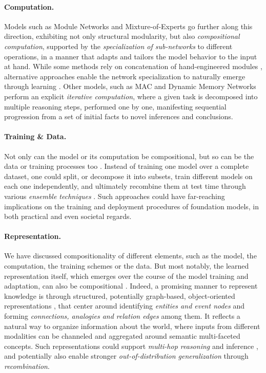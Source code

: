 \paragraph{Computation.}
Models such as Module Networks \citep{nmn} and Mixture-of-Experts \citep{moe} go further along this direction, exhibiting not only structural modularity, but also \textit{compositional computation}, supported by the \textit{specialization of sub-networks} to different operations, in a manner that adapts and tailors the model behavior to the input at hand. While some methods rely on concatenation of hand-engineered modules \citep{nmn}, alternative approaches  enable the network specialization to naturally emerge through learning \citep{moe}. Other models, such as MAC \citep{mac} and Dynamic Memory Networks \citep{dmn} perform an explicit \textit{iterative computation}, where a given task is decomposed into multiple reasoning steps, performed one by one, manifesting sequential progression from a set of initial facts to novel inferences and conclusions.
  
\paragraph{Training \& Data.} 
Not only can the model or its computation be compositional, but so can be the data or training processes too \citep{andreas2019good}. Instead of training one model over a complete dataset, one could split, or decompose it into subsets, train different models on each one independently, and ultimately recombine them at test time through various \textit{ensemble techniques} \citep{ensemble}. Such approaches could have far-reaching implications on the training and deployment procedures of foundation models, in both practical and even societal regards.

\paragraph{Representation.} 
We have discussed compositionality of different elements, such as the model, the computation, the training schemes or the data. But most notably, the learned representation itself, which emerges over the course of the model training and adaptation, can also be compositional \citep{andreas2019measuring}. Indeed, a promising manner to represent knowledge is through structured, potentially graph-based, object-oriented representations \citep{Zhang2019ERNIEEL,kepler}, that center around identifying \textit{entities and event nodes} and forming \textit{connections, analogies and relation edges} among them. It reflects a natural way to organize information about the world, where inputs from different modalities can be channeled and aggregated around semantic multi-faceted concepts. Such representations could support \textit{multi-hop reasoning} and inference \citep{kbert, colake, jaket}, and potentially also enable stronger \textit{out-of-distribution generalization} through \textit{recombination}. 

